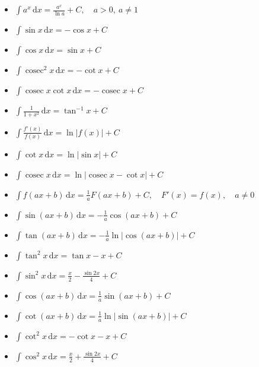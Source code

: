 \documentclass[11pt,a4paper,fleqn]{article}
\newcommand{\dd}{\,\mathrm{d}}
\newcommand{\cosec}{\operatorname{cosec}}
\newenvironment{integrallist}
  {\begin{itemize}[
      label=\(\bullet\),
      leftmargin=1.65em,
      labelsep=0.55em,
      itemsep=0.55em,
      topsep=0.15em,
      parsep=0pt,
      partopsep=0pt
    ]}
  {\end{itemize}}
\begin{document}
\begin{minipage}[t]{0.485\textwidth}
\vspace{0pt}
\begin{integrallist}
\item \(\displaystyle
      \int a^x\dd x=\frac{a^x}{\ln a}+C,\quad a>0,\ a\ne1\)
\item \(\displaystyle
      \int \sin x\dd x=-\cos x+C\)
\item \(\displaystyle
      \int \cos x\dd x=\sin x+C\)
\item \(\displaystyle
      \int \cosec^2x\dd x=-\cot x+C\)
\item \(\displaystyle
      \int \cosec x\cot x\dd x=-\cosec x+C\)
\item \(\displaystyle
      \int \frac{1}{1+x^2}\dd x=\tan^{-1}x+C\)
\item \(\displaystyle
      \int \frac{f'(x)}{f(x)}\dd x=\ln|f(x)|+C\)
\item \(\displaystyle
      \int \cot x\dd x=\ln|\sin x|+C\)
\item \(\displaystyle
      \int \cosec x\dd x=\ln|\cosec x-\cot x|+C\)
\end{integrallist}
\end{minipage}

\begin{integrallist}
\item \(\displaystyle
      \int f(ax+b)\dd x
      =\frac{1}{a}F(ax+b)+C,\quad F'(x)=f(x),\quad a\ne0\)
\end{integrallist}

\noindent
\begin{minipage}[t]{0.485\textwidth}
\vspace{0pt}
\begin{integrallist}
\item \(\displaystyle
      \int \sin(ax+b)\dd x=-\frac{1}{a}\cos(ax+b)+C\)
\item \(\displaystyle
      \int \tan(ax+b)\dd x
      =-\frac{1}{a}\ln|\cos(ax+b)|+C\)
\item \(\displaystyle
      \int \tan^2x\dd x=\tan x-x+C\)
\item \(\displaystyle
      \int \sin^2x\dd x=\frac{x}{2}-\frac{\sin 2x}{4}+C\)
\end{integrallist}
\end{minipage}
\hfill
\begin{minipage}[t]{0.485\textwidth}
\vspace{0pt}
\begin{integrallist}
\item \(\displaystyle
      \int \cos(ax+b)\dd x=\frac{1}{a}\sin(ax+b)+C\)
\item \(\displaystyle
      \int \cot(ax+b)\dd x
      =\frac{1}{a}\ln|\sin(ax+b)|+C\)
\item \(\displaystyle
      \int \cot^2x\dd x=-\cot x-x+C\)
\item \(\displaystyle
      \int \cos^2x\dd x=\frac{x}{2}+\frac{\sin 2x}{4}+C\)
\end{integrallist}
\end{minipage}
\end{document}
